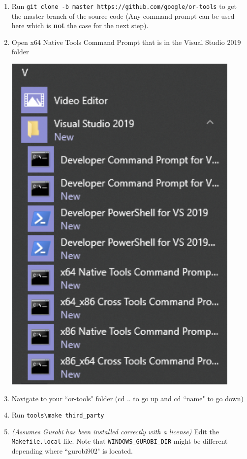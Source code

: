\documentclass[11 pt]{article}
\newcommand{\code}[1]{\colorbox{gray!10}{\textcolor{black!85}{\texttt{#1}}}}
\begin{document}
\begin{enumerate}
\item Run \code{git clone -b master https://github.com/google/or-tools} to get the master branch of the source code (Any command prompt can be used here which is \textbf{not} the case for the next step).
\item Open x64 Native Tools Command Prompt that is in the Visual Studio 2019 folder
\begin{center}
\includegraphics[scale=0.5]{images/NativeToolsCommandPrompt.png}
\end{center}
\item Navigate to your ``or-tools" folder (cd .. to go up and cd ``name" to go down)
\item Run \code{tools\textbackslash make third\_party}
\item \textit{(Assumes Gurobi has been installed correctly with a license)} Edit the \texttt{Makefile.local} file. Note that \texttt{WINDOWS\_GUROBI\_DIR} might be different depending where ``gurobi902" is located. 
\begin{center}

\end{center}
\end{enumerate}
\end{document}
